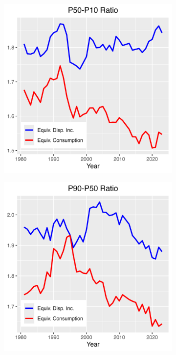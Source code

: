 \documentclass{article}
\begin{document}
\begin{figure}[p]
\begin{subfigure}[t]{0.475\textwidth}
    \end{subfigure}
    \begin{subfigure}[t]{0.475\textwidth}
        \centering
        \includegraphics[width=\textwidth]{figures/Fig_6/Fig_6c.png}
    \end{subfigure}
    \begin{subfigure}[t]{0.475\textwidth}
        \centering
        \includegraphics[width=\textwidth]{figures/Fig_6/Fig_6d.png}

\end{subfigure}
\end{figure}
\end{document}
